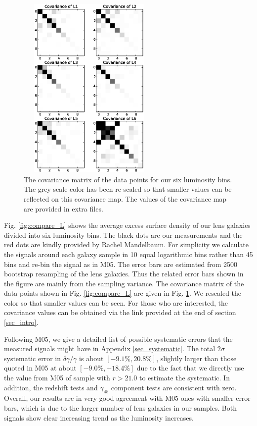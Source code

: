 \documentclass[apj]{emulateapj}
\begin{document}
\begin{figure}
\centering
\includegraphics[width=7cm,height=9cm]{f6.eps}
\caption{The covariance matrix of the data points for our six
  luminosity bins. The grey scale color has been re-scaled so that
  smaller values can be reflected on this covariance map.  The values
  of the covariance map are provided in extra files. }
  \label{fig:covar_L}
\end{figure}

Fig. \ref{fig:compare_L} shows the average excess surface density of
our lens galaxies divided into six luminosity bins. The black dots are
our measurements and the red dots are kindly provided by Rachel
Mandelbaum. For simplicity we calculate the signals around each galaxy
sample in 10 equal logarithmic bins rather than 45 bins and re-bin the
signal as in M05. The error bars are estimated from 2500 bootstrap
resampling of the lens galaxies. Thus the related error bars shown in
the figure are mainly from the sampling variance.  The covariance
matrix of the data points shown in Fig.  \ref{fig:compare_L} are given
in Fig.  \ref{fig:covar_L}.  We rescaled the color so that smaller
values can be seen. For those who are interested, the covariance
values can be obtained via the link provided at the end of section
\ref{sec_intro}.

Following M05, we give a detailed list of possible systematic errors
that the measured signals might have in Appendix \ref{sec_systematic}.
The total $2\sigma$ systematic error in $\delta \gamma/\gamma$ is
about $[-9.1\%,20.8\%]$, slightly larger than those quoted in M05 at
about $[-9.0\%,+18.4\%]$ due to the fact that we directly use the
value from M05 of sample with $r>21.0$ to estimate the systematic.  In
addition, the redshift tests and $\gamma_{45}$ component tests are
consistent with zero.  Overall, our results are in very good agreement
with M05 ones with smaller error bars, which is due to the larger
number of lens galaxies in our samples. Both signals show clear
increasing trend as the luminosity increases.
\end{document}
